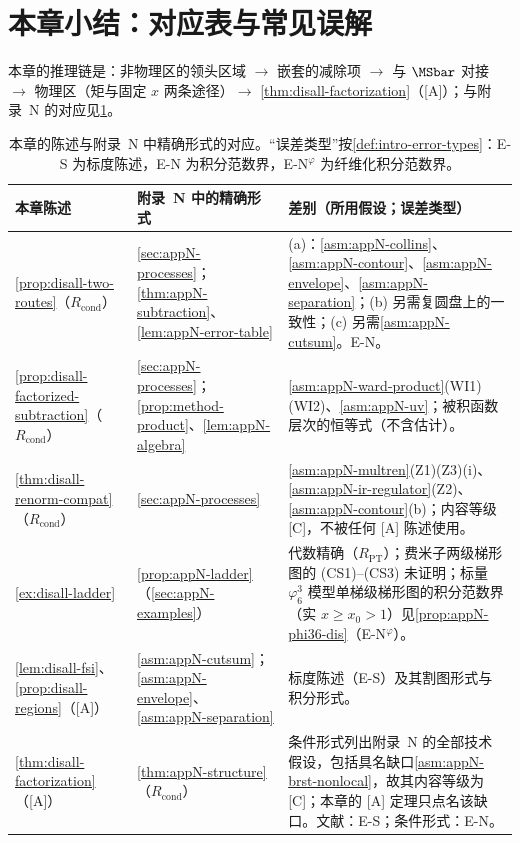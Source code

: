 \section{本章小结：对应表与常见误解}\label{sec:disall-summary}

本章的推理链是：非物理区的领头区域 $\to$ 嵌套的减除项 $\to$ 与 $\MSbar$ 对接 $\to$ 物理区（矩与固定 $x$ 两条途径）$\to$ \cref{thm:disall-factorization}（[A]）；与附录~N 的对应见\cref{tab:disall-correspondence}。

\begin{table}[htbp]
\centering
\caption{本章的陈述与附录~N 中精确形式的对应。“误差类型”按\cref{def:intro-error-types}：E-S 为标度陈述，E-N 为积分范数界，E-N$^\varphi$ 为纤维化积分范数界。}
\label{tab:disall-correspondence}
\small
\begin{tabularx}{\textwidth}{@{}>{\raggedright\arraybackslash}p{}>{\raggedright\arraybackslash}p{}>{\raggedright\arraybackslash}X@{}}
\toprule
本章陈述 & 附录~N 中的精确形式 & 差别（所用假设；误差类型） \\
\midrule
\cref{prop:disall-two-routes}（$R_{\mathrm{cond}}$） & \cref{sec:appN-processes}；\cref{thm:appN-subtraction}、\cref{lem:appN-error-table} &
(a)：\cref{asm:appN-collins}、\cref{asm:appN-contour}、\cref{asm:appN-envelope}、\cref{asm:appN-separation}；(b) 另需复圆盘上的一致性；(c) 另需\cref{asm:appN-cutsum}。E-N。 \\
\cref{prop:disall-factorized-subtraction}（$R_{\mathrm{cond}}$） & \cref{sec:appN-processes}；\cref{prop:method-product}、\cref{lem:appN-algebra} &
\cref{asm:appN-ward-product}(WI1)(WI2)、\cref{asm:appN-uv}；被积函数层次的恒等式（不含估计）。 \\
\cref{thm:disall-renorm-compat}（$R_{\mathrm{cond}}$） & \cref{sec:appN-processes} &
\cref{asm:appN-multren}(Z1)(Z3)(i)、\cref{asm:appN-ir-regulator}(Z2)、\cref{asm:appN-contour}(b)；内容等级 [C]，不被任何 [A] 陈述使用。 \\
\cref{ex:disall-ladder} & \cref{prop:appN-ladder}（\cref{sec:appN-examples}） &
代数精确（$R_{\mathrm{PT}}$）；费米子两级梯形图的 (CS1)--(CS3) 未证明；标量 $\varphi^3_6$ 模型单梯级梯形图的积分范数界（实 $x\ge x_0>1$）见\cref{prop:appN-phi36-dis}（E-N$^\varphi$）。 \\
\cref{lem:disall-fsi}、\cref{prop:disall-regions}（[A]） & \cref{asm:appN-cutsum}；\cref{asm:appN-envelope}、\cref{asm:appN-separation} &
标度陈述（E-S）及其割图形式与积分形式。 \\
\cref{thm:disall-factorization}（[A]） & \cref{thm:appN-structure}（$R_{\mathrm{cond}}$） &
条件形式列出附录~N 的全部技术假设，包括具名缺口\cref{asm:appN-brst-nonlocal}，故其内容等级为 [C]；本章的 [A] 定理只点名该缺口。文献：E-S；条件形式：E-N。 \\
\bottomrule
\end{tabularx}
\end{table}

